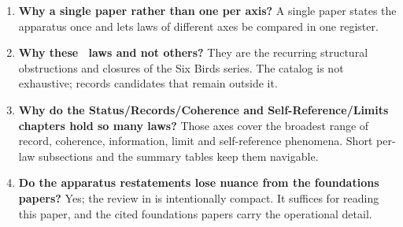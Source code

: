 \begin{enumerate}[label=\textbf{O\arabic*.}, leftmargin=*]
\item \textbf{Why a single paper rather than one per axis?}
A single paper states the apparatus once and lets laws of different
axes be compared in one register.

\item \textbf{Why these \NumLaws\ laws and not others?}
They are the recurring structural obstructions and closures of the
Six Birds series.  The catalog is not exhaustive; 
records candidates that remain outside it.

\item \textbf{Why do the Status/Records/Coherence and
Self-Reference/Limits chapters hold so many laws?}
Those axes cover the broadest range of record, coherence, information,
limit and self-reference phenomena.  Short per-law subsections and the
summary tables keep them navigable.

\item \textbf{Do the apparatus restatements lose nuance from the
foundations papers?}
Yes; the review in  is intentionally compact.  It
suffices for reading this paper, and the cited foundations papers carry
the operational detail.
\end{enumerate}
